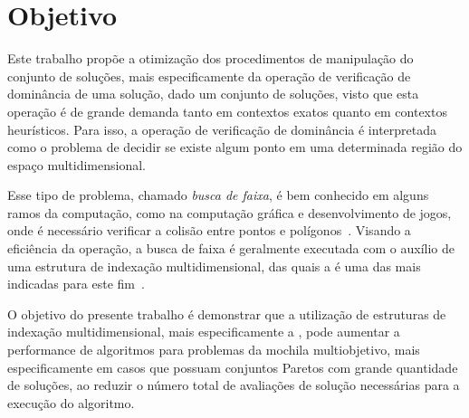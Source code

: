 \section{Objetivo}

Este trabalho propõe a otimização dos procedimentos de manipulação do conjunto
de soluções, mais especificamente da operação de verificação de dominância de uma solução,
dado um conjunto de soluções, visto que esta operação é de grande
demanda tanto em contextos exatos quanto em contextos heurísticos.
Para isso, a operação de verificação de dominância é interpretada como
o problema de decidir se existe algum ponto em uma determinada região
do espaço multidimensional.

Esse tipo de problema, chamado \emph{busca de faixa}, é bem conhecido em alguns
ramos da computação, como na computação gráfica e desenvolvimento de jogos,
onde é necessário verificar a colisão entre pontos e polígonos~\cite{sedgewick1988algorithms}.
Visando a eficiência da operação, a busca de faixa é geralmente executada
com o auxílio de uma estrutura de indexação multidimensional,
das quais a \kdtree{} é uma das mais indicadas para este fim~\cite{agarwal1999geometric, sedgewick1988algorithms}.

O objetivo do presente trabalho é demonstrar que a utilização de estruturas
de indexação multidimensional, mais especificamente a \kdtree{}, pode aumentar a performance
de algoritmos para problemas da mochila multiobjetivo, mais especificamente em casos
que possuam conjuntos Paretos com grande quantidade de soluções, ao reduzir
o número total de avaliações de solução necessárias para a execução do algoritmo.



